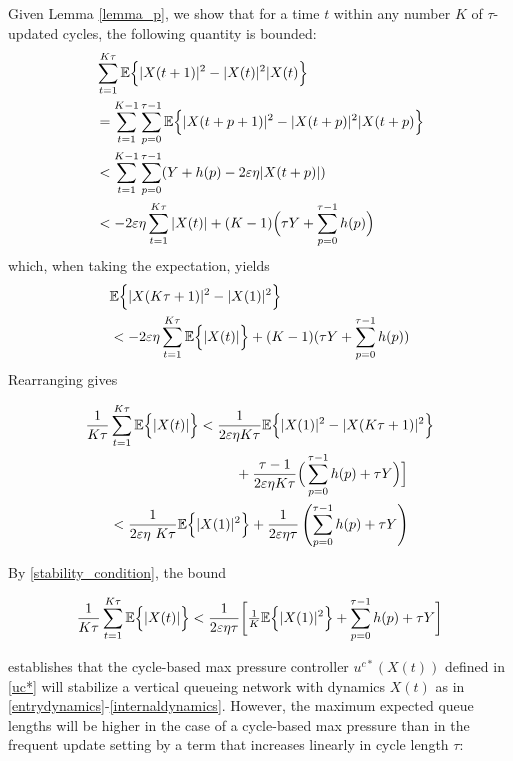 Given Lemma \ref{lemma_p}, we show that for a time $t$ within any number $K$ of $\tau$-updated cycles, the following quantity is bounded:
\begin{align} \nonumber 
&\sum_{t = 1}^{K \tau} \mathbb{E}\Big\{ \vert X(t + 1)\vert^2 - \vert X(t)\vert^2 \vert X(t) \Big\}\\ \nonumber
&=\sum_{t=1}^{K-1} \sum_{p=0 }^{\tau - 1} \mathbb{E}\Big\{ \vert X(t + p + 1)\vert^2 - \vert X(t + p)\vert^2 \vert X(t + p) \Big\}\\ \nonumber
&< \sum_{t=1}^{K-1} \sum_{p=0 }^{\tau - 1} (Y+ h(p) -2\varepsilon\eta \vert X(t + p )\vert ) \\
&< -2\varepsilon \eta \sum_{t=1}^{K \tau} \vert X(t )\vert  + (K - 1) \Big(\tau Y+\sum_{p=0 }^{\tau - 1} h(p) \Big) \label{equivalencestabcycleMP}
\end{align}
which, when taking the expectation, yields
\begin{align} \nonumber 
& \mathbb{E}\Big\{ \vert X(K \tau + 1)\vert^2 - \vert X(1)\vert^2  \Big\} \\
& <  -2\varepsilon\eta \sum_{t=1}^{K \tau} \mathbb{E}\Big\{ \vert X(t )\vert \Big\}+ (K - 1) ( \tau Y+\sum_{p=0 }^{\tau - 1} h(p) )
\end{align}
Rearranging gives
\begin{small}
\begin{align} \nonumber 
\dfrac{1}{K \tau}& \sum_{t=1}^{K \tau}  \mathbb{E}\Big\{ \vert X(t )\vert \Big\} < \frac{1}{2\varepsilon\eta K \tau} \mathbb{E}\Big\{ \vert X(1)\vert^2 - \vert X(K \tau + 1)\vert^2   \Big\} \\
&  \qquad \qquad \qquad \qquad \quad + \frac{\tau-1}{2\varepsilon\eta K\tau }   \Big(\sum_{p=0 }^{\tau - 1} h(p) + \tau Y \Big) \Big] \\
&< \dfrac{1}{2\varepsilon\eta\ K \tau}\mathbb{E}\Big\{ \vert X( 1)\vert^2 \Big\} + \dfrac{ 1}{2\varepsilon\eta \tau} \left(\sum_{p=0 }^{\tau - 1} h(p) + \tau Y\right) \label{finalbound}
\end{align}
\end{small}
By \eqref{stability_condition}, the bound 
\begin{small}
\begin{equation*} \label{CYCLE_BOUNDS} 
\dfrac{1}{K \tau} \sum_{t=1}^{K \tau}  \mathbb{E}\Big\{ \vert X(t )\vert \Big\} <  \frac{1}{2\varepsilon\eta \tau }\bigg[ \tfrac{1}{K} \mathbb{E}\Big\{ \vert X( 1)\vert^2 \Big\} +  \sum_{p=0 }^{\tau - 1} h(p) + \tau Y  \bigg]
\end{equation*}
\end{small}establishes that the cycle-based max pressure controller $u^{c*}(X(t))$ defined in \eqref{uc*} will stabilize a vertical queueing network with dynamics $X(t)$ as in \eqref{entrydynamics}-\eqref{internaldynamics}. However, the maximum expected queue lengths will be higher in the case of a cycle-based max pressure than in the  frequent update setting by a term that increases linearly in cycle length $\tau$:
